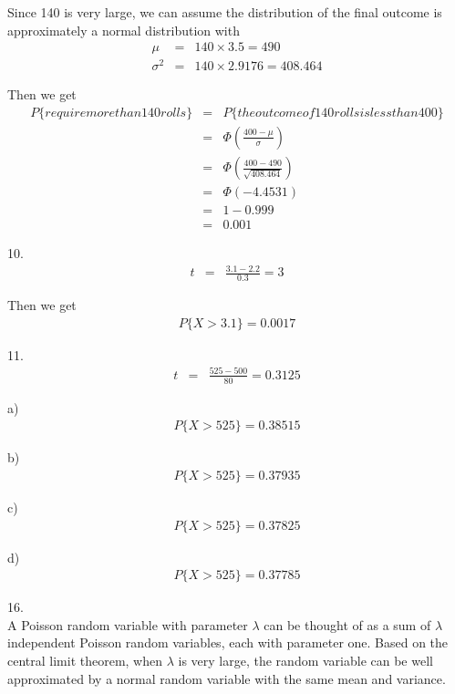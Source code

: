\documentclass[12pt]{article}
\begin{document}
Since 140 is very large, we can assume the distribution of the final outcome is approximately a normal distribution with
\begin{eqnarray*}
  \mu &=& 140 \times 3.5 = 490 \\
  \sigma^2 &=& 140 \times 2.9176 = 408.464
\end{eqnarray*}

Then we get
\begin{eqnarray*}
  P \{ require more than 140 rolls \}
  &=& P \{ the outcome of 140 rolls is less than 400 \} \\
  &=& \Phi(\frac{400 - \mu}{\sigma}) \\
  &=& \Phi(\frac{400 - 490}{\sqrt {408.464}}) \\
  &=& \Phi(-4.4531) \\
  &=& 1 - 0.999 \\
  &=& 0.001
\end{eqnarray*}

10.
\begin{eqnarray*}
  t &=& \frac {3.1 - 2.2}{0.3} = 3
\end{eqnarray*}

Then we get
\begin{eqnarray*}
  P\{ X > 3.1 \} = 0.0017
\end{eqnarray*}

11. \\
\begin{eqnarray*}
  t &=& \frac {525 - 500}{80} = 0.3125
\end{eqnarray*}

a)
\begin{eqnarray*}
  P\{ X > 525 \} = 0.38515
\end{eqnarray*}

b)
\begin{eqnarray*}
  P\{ X > 525 \} = 0.37935
\end{eqnarray*}

c)
\begin{eqnarray*}
  P\{ X > 525 \} = 0.37825
\end{eqnarray*}

d)
\begin{eqnarray*}
  P\{ X > 525 \} = 0.37785
\end{eqnarray*}

16. \\

A Poisson random variable with parameter $\lambda$ can be thought of as a sum of $\lambda$ independent Poisson random variables, each with parameter one. Based on the central limit theorem, when $\lambda$ is very large, the random variable can be well approximated by a normal random variable with the same mean and variance.
\end{document}
